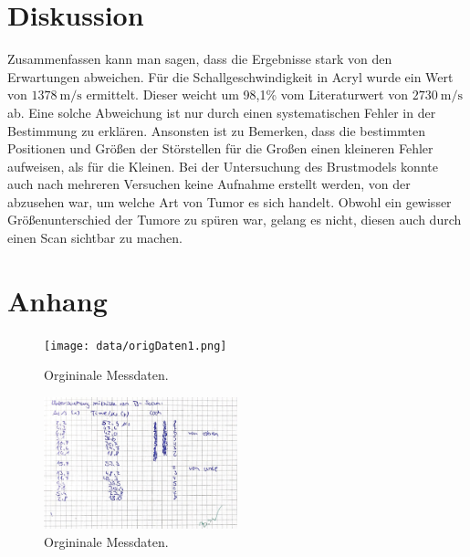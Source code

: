 \section{Diskussion}
\label{sec:Diskussion}

Zusammenfassen kann man sagen, dass die Ergebnisse stark von den Erwartungen abweichen.
\newline
Für die Schallgeschwindigkeit in Acryl wurde ein Wert von $\SI{1378}{\meter\per\second}$ ermittelt. Dieser weicht um 98,1\% vom Literaturwert von
$\SI{2730}{\meter\per\second}$ ab. Eine solche Abweichung ist nur durch einen systematischen Fehler in der Bestimmung zu erklären.
\newline
Ansonsten ist zu Bemerken, dass die bestimmten Positionen und Größen der Störstellen für die Großen einen kleineren Fehler aufweisen, als für die Kleinen.
\newline
Bei der Untersuchung des Brustmodels konnte auch nach mehreren Versuchen keine Aufnahme erstellt werden, von der abzusehen war, um welche Art von Tumor es
sich handelt. Obwohl ein gewisser Größenunterschied der Tumore zu spüren war, gelang es nicht, diesen auch durch einen Scan sichtbar zu machen.

\printbibliography{}

\section*{Anhang}
\label{Anhang}

\begin{figure}[H]
    \centering
    \texttt{[image: data/origDaten1.png]}
    \caption{Orgininale Messdaten.}
    \label{fig:origDaten1}
\end{figure}

\begin{figure}[H]
    \centering
    \includegraphics[width=0.5\textwidth]{data/origDaten2.png}
    \caption{Orgininale Messdaten.}
    \label{fig:origDaten2}
\end{figure}